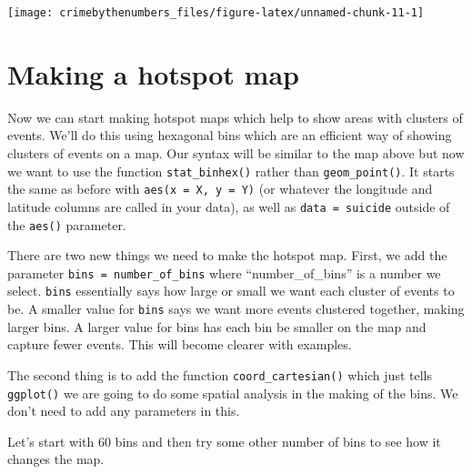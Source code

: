 \documentclass[
  12pt,
]{book}
\newenvironment{Shaded}{\begin{snugshade}}{\end{snugshade}}
\newcommand{\AttributeTok}[1]{\textcolor[rgb]{0.61,0.61,0.61}{#1}}
\newcommand{\FunctionTok}[1]{\textcolor[rgb]{0,0,0}{#1}}
\newcommand{\NormalTok}[1]{#1}
\newcommand{\SpecialCharTok}[1]{\textcolor[rgb]{0,0,0}{#1}}
\newcommand{\StringTok}[1]{\textcolor[rgb]{0.5,0.5,0.5}{#1}}
\begin{document}
\begin{Shaded}
\end{Shaded}

\begin{center}\texttt{[image: crimebythenumbers\_files/figure-latex/unnamed-chunk-11-1]} \end{center}

\hypertarget{making-a-hotspot-map}{%
\section{Making a hotspot map}\label{making-a-hotspot-map}}

Now we can start making hotspot maps which help to show areas with clusters of events. We'll do this using hexagonal bins which are an efficient way of showing clusters of events on a map. Our syntax will be similar to the map above but now we want to use the function \texttt{stat\_binhex()} rather than \texttt{geom\_point()}. It starts the same as before with \texttt{aes(x\ =\ X,\ y\ =\ Y)} (or whatever the longitude and latitude columns are called in your data), as well as \texttt{data\ =\ suicide} outside of the \texttt{aes()} parameter.

There are two new things we need to make the hotspot map. First, we add the parameter \texttt{bins\ =\ number\_of\_bins} where ``number\_of\_bins'' is a number we select. \texttt{bins} essentially says how large or small we want each cluster of events to be. A smaller value for \texttt{bins} says we want more events clustered together, making larger bins. A larger value for bins has each bin be smaller on the map and capture fewer events. This will become clearer with examples.

The second thing is to add the function \texttt{coord\_cartesian()} which just tells \texttt{ggplot()} we are going to do some spatial analysis in the making of the bins. We don't need to add any parameters in this.

Let's start with 60 bins and then try some other number of bins to see how it changes the map.
\end{document}
